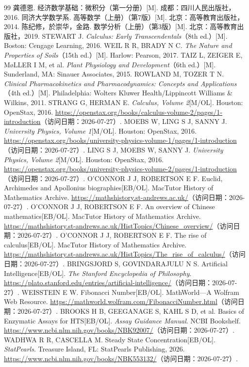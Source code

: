 \documentclass[fontset=fandol]{ctexart}
\begin{document}
\fi


\clearpage
\renewcommand{\refname}{参考文献}
\begin{thebibliography}{99}
\small
\setlength{\itemsep}{0.2\baselineskip}
 龚德恩. 经济数学基础：微积分（第一分册）[M]. 成都：四川人民出版社，2016.
 同济大学数学系. 高等数学（上册）（第7版）[M]. 北京：高等教育出版社，2014.
 陈纪修，於崇华，金路. 数学分析（上册）（第3版）[M]. 北京：高等教育出版社，2019.
 STEWART J. \emph{Calculus: Early Transcendentals}（8th ed.）[M]. Boston: Cengage Learning, 2016.
 WEIL R R, BRADY N C. \emph{The Nature and Properties of Soils}（15th ed.）[M]. Harlow: Pearson, 2017.
 TAIZ L, ZEIGER E, M{\o}LLER I M, et al. \emph{Plant Physiology and Development}（6th ed.）[M]. Sunderland, MA: Sinauer Associates, 2015.
 ROWLAND M, TOZER T N. \emph{Clinical Pharmacokinetics and Pharmacodynamics: Concepts and Applications}（4th ed.）[M]. Philadelphia: Wolters Kluwer Health/Lippincott Williams \& Wilkins, 2011.
 STRANG G, HERMAN E. \emph{Calculus, Volume 2}[M/OL]. Houston: OpenStax, 2016. \url{https://openstax.org/books/calculus-volume-2/pages/1-introduction}（访问日期：2026-07-27）.
 MOEBS W, LING S J, SANNY J. \emph{University Physics, Volume 1}[M/OL]. Houston: OpenStax, 2016. \url{https://openstax.org/books/university-physics-volume-1/pages/1-introduction}（访问日期：2026-07-27）.
 LING S J, MOEBS W, SANNY J. \emph{University Physics, Volume 2}[M/OL]. Houston: OpenStax, 2016. \url{https://openstax.org/books/university-physics-volume-2/pages/1-introduction}（访问日期：2026-07-27）.
 O'CONNOR J J, ROBERTSON E F. Euclid, Archimedes and Apollonius biographies[EB/OL]. MacTutor History of Mathematics Archive. \url{https://mathshistory.st-andrews.ac.uk/}（访问日期：2026-07-27）.
 O'CONNOR J J, ROBERTSON E F. An overview of Chinese mathematics[EB/OL]. MacTutor History of Mathematics Archive. \url{https://mathshistory.st-andrews.ac.uk/HistTopics/Chinese_overview/}（访问日期：2026-07-27）.
 O'CONNOR J J, ROBERTSON E F. The rise of calculus[EB/OL]. MacTutor History of Mathematics Archive. \url{https://mathshistory.st-andrews.ac.uk/HistTopics/The_rise_of_calculus/}（访问日期：2026-07-27）.
 BRINGSJORD S, GOVINDARAJULU N S. Artificial Intelligence[EB/OL]. \emph{The Stanford Encyclopedia of Philosophy}. \url{https://plato.stanford.edu/entries/artificial-intelligence/}（访问日期：2026-07-27）.
 WEISSTEIN E W. Fibonacci Number[EB/OL]. MathWorld---A Wolfram Web Resource. \url{https://mathworld.wolfram.com/FibonacciNumber.html}（访问日期：2026-07-27）.
 BROOKS H B, GEEGANAGE S, KAHL S D, et al. Basics of Enzymatic Assays for HTS[EB/OL]. \emph{Assay Guidance Manual}. NCBI Bookshelf. \url{https://www.ncbi.nlm.nih.gov/books/NBK92007/}（访问日期：2026-07-27）.
 WADHWA R R, CASCELLA M. Steady State Concentration[EB/OL]. \emph{StatPearls}. Treasure Island, FL: StatPearls Publishing, 2026. \url{https://www.ncbi.nlm.nih.gov/books/NBK553132/}（访问日期：2026-07-27）.
\end{thebibliography}
\end{document}
